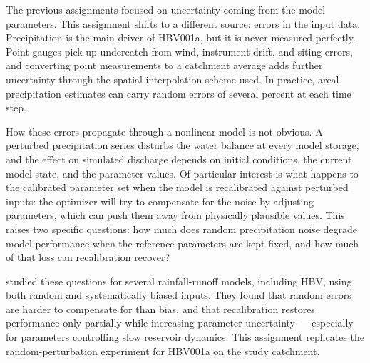 The previous assignments focused on uncertainty coming from the model parameters. This assignment shifts to a different source: errors in the input data. Precipitation is the main driver of HBV001a, but it is never measured perfectly. Point gauges pick up undercatch from wind, instrument drift, and siting errors, and converting point measurements to a catchment average adds further uncertainty through the spatial interpolation scheme used. In practice, areal precipitation estimates can carry random errors of several percent at each time step.

How these errors propagate through a nonlinear model is not obvious. A perturbed precipitation series disturbs the water balance at every model storage, and the effect on simulated discharge depends on initial conditions, the current model state, and the parameter values. Of particular interest is what happens to the calibrated parameter set when the model is recalibrated against perturbed inputs: the optimizer will try to compensate for the noise by adjusting parameters, which can push them away from physically plausible values. This raises two specific questions: how much does random precipitation noise degrade model performance when the reference parameters are kept fixed, and how much of that loss can recalibration recover?

\textcite{Oudin.2006} studied these questions for several rainfall-runoff models, including HBV, using both random and systematically biased inputs. They found that random errors are harder to compensate for than bias, and that recalibration restores performance only partially while increasing parameter uncertainty --- especially for parameters controlling slow reservoir dynamics. This assignment replicates the random-perturbation experiment for HBV001a on the study catchment.
